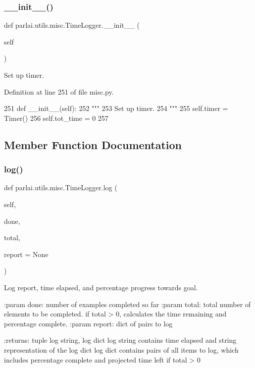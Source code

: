 \subsubsection{\texorpdfstring{\+\_\+\+\_\+init\+\_\+\+\_\+()}{\_\_init\_\_()}}
{\footnotesize\ttfamily def parlai.\+utils.\+misc.\+Time\+Logger.\+\_\+\+\_\+init\+\_\+\+\_\+ (\begin{DoxyParamCaption}\item[{}]{self }\end{DoxyParamCaption})}

\begin{DoxyVerb}Set up timer.
\end{DoxyVerb}
 

Definition at line 251 of file misc.\+py.


\begin{DoxyCode}
251     \textcolor{keyword}{def }\_\_init\_\_(self):
252         \textcolor{stringliteral}{"""}
253 \textcolor{stringliteral}{        Set up timer.}
254 \textcolor{stringliteral}{        """}
255         self.timer = Timer()
256         self.tot\_time = 0
257 
\end{DoxyCode}


\subsection{Member Function Documentation}
\mbox{\label{classparlai_1_1utils_1_1misc_1_1TimeLogger_a52458d882781ad6a6cbcea479ff495de}} 
\subsubsection{\texorpdfstring{log()}{log()}}
{\footnotesize\ttfamily def parlai.\+utils.\+misc.\+Time\+Logger.\+log (\begin{DoxyParamCaption}\item[{}]{self,  }\item[{}]{done,  }\item[{}]{total,  }\item[{}]{report = {\ttfamily None} }\end{DoxyParamCaption})}

\begin{DoxyVerb}Log report, time elapsed, and percentage progress towards goal.

:param done: number of examples completed so far
:param total: total number of elements to be completed. if total > 0,
      calculates the time remaining and percentage complete.
:param report: dict of pairs to log

:returns: tuple log string, log dict
    log string contains time elapsed and string representation of
    the log dict
    log dict contains pairs of all items to log, which includes
    percentage complete and projected time left if total > 0
\end{DoxyVerb}
 

